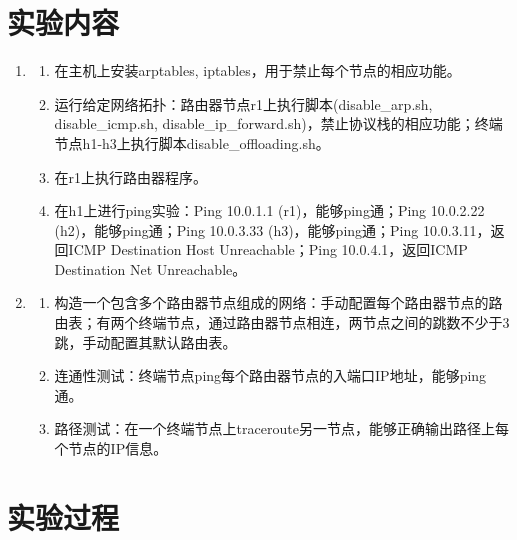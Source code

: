 \documentclass[UTF8]{report}
\begin{document}
\pagestyle{fancy}

\maketitle

\section{实验内容}

\begin{enumerate}
    \item 
    \begin{enumerate}
        \item 在主机上安装arptables, iptables，用于禁止每个节点的相应功能。
        \item 运行给定网络拓扑：路由器节点r1上执行脚本(disable_arp.sh, disable_icmp.sh, disable_ip_forward.sh)，禁止协议栈的相应功能；终端节点h1-h3上执行脚本disable_offloading.sh。
        \item 在r1上执行路由器程序。
        \item 在h1上进行ping实验：Ping 10.0.1.1 (r1)，能够ping通；Ping 10.0.2.22 (h2)，能够ping通；Ping 10.0.3.33 (h3)，能够ping通；Ping 10.0.3.11，返回ICMP Destination Host Unreachable；Ping 10.0.4.1，返回ICMP Destination Net Unreachable。
    \end{enumerate}
    \item 
    \begin{enumerate}
        \item 构造一个包含多个路由器节点组成的网络：手动配置每个路由器节点的路由表；有两个终端节点，通过路由器节点相连，两节点之间的跳数不少于3跳，手动配置其默认路由表。
        \item 连通性测试：终端节点ping每个路由器节点的入端口IP地址，能够ping通。
        \item 路径测试：在一个终端节点上traceroute另一节点，能够正确输出路径上每个节点的IP信息。
    \end{enumerate}
\end{enumerate}

\section{实验过程}
\end{document}
